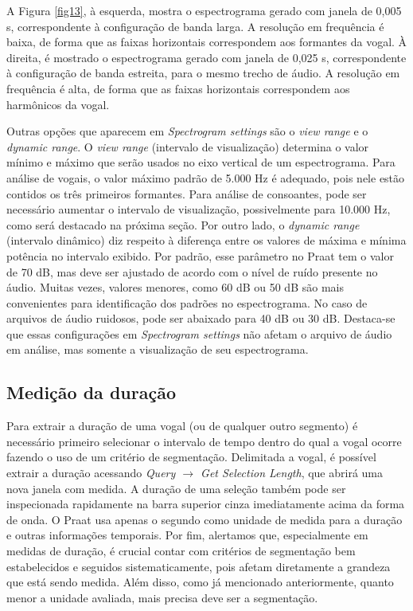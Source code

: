 \documentclass[portuguese]{textolivre}
\begin{document}
A Figura \ref{fig13}, à esquerda, mostra o espectrograma gerado com janela de 0,005 s, correspondente à configuração de banda larga. A resolução em frequência é baixa, de forma que as faixas horizontais correspondem aos formantes da vogal. À direita, é mostrado o espectrograma gerado com janela de 0,025 s, correspondente à configuração de banda estreita, para o mesmo trecho de áudio. A resolução em frequência é alta, de forma que as faixas horizontais correspondem aos harmônicos da vogal.

Outras opções que aparecem em \textit{Spectrogram settings} são o \textit{view range} e o \textit{dynamic range}. O \textit{view range} (intervalo de visualização) determina o valor mínimo e máximo que serão usados no eixo vertical de um espectrograma. Para análise de vogais, o valor máximo padrão de 5.000 Hz é adequado, pois nele estão contidos os três primeiros formantes. Para análise de consoantes, pode ser necessário aumentar o intervalo de visualização, possivelmente para 10.000 Hz, como será destacado na próxima seção. Por outro lado, o \textit{dynamic range} (intervalo dinâmico) diz respeito à diferença entre os valores de máxima e mínima potência no intervalo exibido. Por padrão, esse parâmetro no Praat tem o valor de 70 dB, mas deve ser ajustado de acordo com o nível de ruído presente no áudio. Muitas vezes, valores menores, como 60 dB ou 50 dB são mais convenientes para identificação dos padrões no espectrograma. No caso de arquivos de áudio ruidosos, pode ser abaixado para 40 dB ou 30 dB. Destaca-se que essas configurações em \textit{Spectrogram settings} não afetam o arquivo de áudio em análise, mas somente a visualização de seu espectrograma.

\subsection{Medição da duração}\label{sec-duracao}
Para extrair a duração de uma vogal (ou de qualquer outro segmento) é necessário primeiro selecionar o intervalo de tempo dentro do qual a vogal ocorre fazendo o uso de um critério de segmentação. Delimitada a vogal, é possível extrair a duração acessando \textit{Query $\rightarrow$ Get Selection Length}, que abrirá uma nova janela com medida. A duração de uma seleção também pode ser inspecionada rapidamente na barra superior cinza imediatamente acima da forma de onda. O Praat usa apenas o segundo como unidade de medida para a duração e outras informações temporais. Por fim, alertamos que, especialmente em medidas de duração, é crucial contar com critérios de segmentação bem estabelecidos e seguidos sistematicamente, pois afetam diretamente a grandeza que está sendo medida. Além disso, como já mencionado anteriormente, quanto menor a unidade avaliada, mais precisa deve ser a segmentação. 
\end{document}
